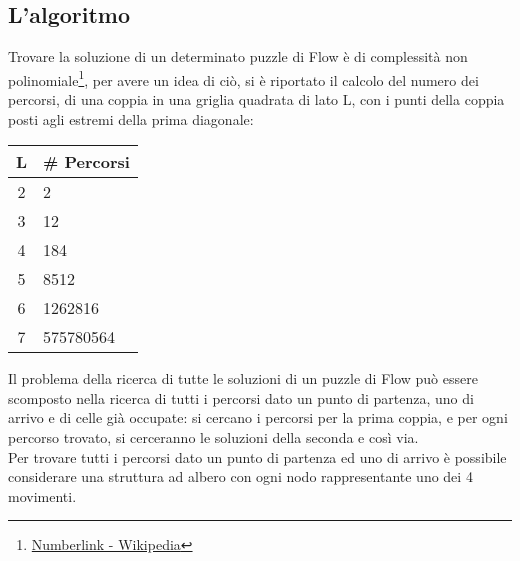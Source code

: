 \documentclass[11pt,a4paper,twocolumn]{IEEEtran}
\newcommand{\mysvg}[2]{}
\newcounter{algoritmo}
\begin{document}
		\subsection*{L'algoritmo}
		Trovare la soluzione di un determinato puzzle di Flow è di complessità non polinomiale\footnote{\href{https://en.wikipedia.org/wiki/Numberlink\#Computational_complexity}{Numberlink - Wikipedia}}, per avere un idea di ciò, si è riportato il calcolo del numero dei percorsi, di una coppia in una griglia quadrata di lato L, con i punti della coppia posti agli estremi della prima diagonale:\\
		\vspace*{-0.2cm}
		\begin{center}
		\begin{tabular}{|c|l|}
			\hline 
			\textbf{\quad L\quad } & \textbf{\# Percorsi} \\ 
			\hline 
			2 & 2 \\ 
			\hline 
			3 & 12 \\ 
			\hline 
			4 & 184 \\ 
			\hline 
			5 & 8512 \\ 
			\hline 
			6 & 1262816 \\ 
			\hline 
			7 & 575780564 \quad\\ 
			\hline 
		\end{tabular}
		\end{center}
	\begin{figure}[h]
		\qquad\quad\text{ }
		\centering
		\mysvg{npaths}{5}
	\end{figure}
    \vspace*{-1.6cm}
    Il problema della ricerca di tutte le soluzioni di un puzzle di Flow può essere scomposto nella ricerca di tutti i percorsi dato un punto di partenza, uno di arrivo e di celle già occupate: si cercano i percorsi per la prima coppia, e per ogni percorso trovato, si cerceranno le soluzioni della seconda e così via.\medskip\\
    Per trovare tutti i percorsi dato un punto di partenza ed uno di arrivo è possibile considerare una struttura ad albero con ogni nodo rappresentante uno dei 4 movimenti.
	\begin{figure}[h]
		\centering
		\footnotesize{\mysvg{tree1}{9}}
	\end{figure}
\end{document}
